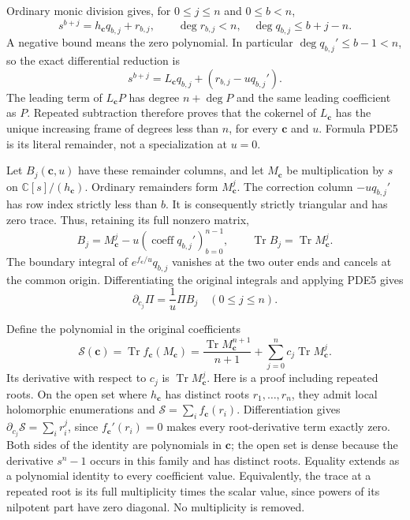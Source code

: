 Ordinary monic division gives, for $0\leq j\leq n$ and $0\leq b<n$,
\[
 s^{b+j}=h_{\mathbf c}q_{b,j}+r_{b,j},\qquad
 \deg r_{b,j}<n,\quad\deg q_{b,j}\leq b+j-n.
 \tag{PDE4}
\]
A negative bound means the zero polynomial. In particular
$\deg q_{b,j}'\leq b-1<n$, so the exact differential reduction is
\[
 s^{b+j}=L_{\mathbf c}q_{b,j}
                    +(r_{b,j}-u q_{b,j}').
 \tag{PDE5}
\]
The leading term of $L_{\mathbf c}P$ has degree $n+\deg P$ and the same
leading coefficient as $P$. Repeated subtraction therefore proves that
the cokernel of $L_{\mathbf c}$ has the unique increasing frame of
degrees less than $n$, for every $\mathbf c$ and $u$. Formula PDE5 is
its literal remainder, not a specialization at $u=0$.

Let $B_j(\mathbf c,u)$ have these remainder columns, and let
$M_{\mathbf c}$ be multiplication by $s$ on
$\mathbb{C}[s]/(h_{\mathbf c})$. Ordinary remainders form
$M_{\mathbf c}^j$. The correction column $-u q_{b,j}'$ has row index
strictly less than $b$. It is consequently strictly triangular and has
zero trace. Thus, retaining its full nonzero matrix,
\[
 B_j=M_{\mathbf c}^{j}-u(\operatorname{coeff}q_{b,j}')_{b=0}^{n-1},
 \qquad \operatorname{Tr}B_j=\operatorname{Tr}M_{\mathbf c}^{j}.
 \tag{PDE6}
\]
The boundary integral of $e^{f_{\mathbf c}/u}q_{b,j}$ vanishes at
the two outer ends and cancels at the common origin. Differentiating
the original integrals and applying PDE5 gives
\[
 \partial_{c_j}\Pi=\frac1u\Pi B_j\quad(0\leq j\leq n).
 \tag{PDE7}
\]

Define the polynomial in the original coefficients
\[
 \mathcal S(\mathbf c)
  =\operatorname{Tr} f_{\mathbf c}(M_{\mathbf c})
  =\frac{\operatorname{Tr}M_{\mathbf c}^{n+1}}{n+1}
                +\sum_{j=0}^n c_j\operatorname{Tr}M_{\mathbf c}^j.
 \tag{PDE8}
\]
Its derivative with respect to $c_j$ is
$\operatorname{Tr}M_{\mathbf c}^j$. Here is a proof including repeated
roots. On the open set where $h_{\mathbf c}$ has distinct roots
$r_1,\ldots,r_n$, they admit local holomorphic enumerations and
$\mathcal S=\sum_i f_{\mathbf c}(r_i)$. Differentiation gives
$\partial_{c_j}\mathcal S=\sum_i r_i^j$, since
$f_{\mathbf c}'(r_i)=0$ makes every root-derivative term exactly zero.
Both sides of the identity are polynomials in $\mathbf c$; the open
set is dense because the derivative $s^n-1$ occurs in this family
and has distinct roots. Equality extends as a polynomial identity to
every coefficient value. Equivalently, the trace at a repeated root
is its full multiplicity times the scalar value, since powers of its
nilpotent part have zero diagonal. No multiplicity is removed.

